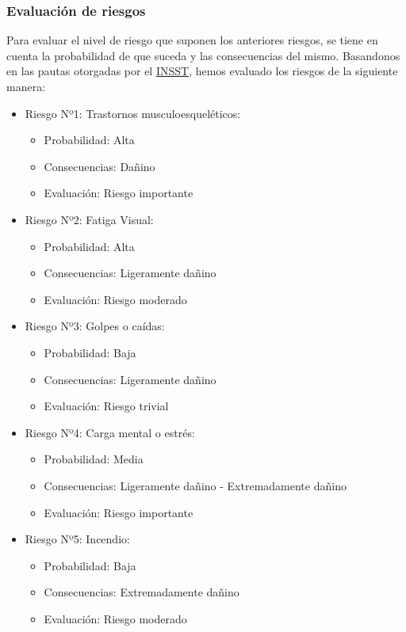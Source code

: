 \subsubsection{Evaluación de riesgos}
Para evaluar el nivel de riesgo que suponen los anteriores riesgos, se tiene en cuenta la probabilidad de que suceda
y las consecuencias del mismo. Basandonos en las pautas otorgadas por el \href{https://www.insst.es/documents/94886/96076/Evaluacion_riesgos.pdf/1371c8cb-7321-48c0-880b-611f6f380c1d?t=1526651610041}{INSST},
hemos evaluado los riesgos de la siguiente manera: \\
\begin{itemize}
    \item Riesgo Nº1: Trastornos musculoesqueléticos: \begin{itemize}
              \item Probabilidad: Alta
              \item Consecuencias: Dañino
              \item Evaluación: Riesgo importante
          \end{itemize}
    \item Riesgo Nº2: Fatiga Visual: \begin{itemize}
              \item Probabilidad: Alta
              \item Consecuencias: Ligeramente dañino
              \item Evaluación: Riesgo moderado
          \end{itemize}
    \item Riesgo Nº3: Golpes o caídas: \begin{itemize}
              \item Probabilidad: Baja
              \item Consecuencias: Ligeramente dañino
              \item Evaluación: Riesgo trivial
          \end{itemize}
    \item Riesgo Nº4: Carga mental o estrés: \begin{itemize}
              \item Probabilidad: Media
              \item Consecuencias: Ligeramente dañino - Extremadamente dañino
              \item Evaluación: Riesgo importante
          \end{itemize}
    \item Riesgo Nº5: Incendio: \begin{itemize}
              \item Probabilidad: Baja
              \item Consecuencias: Extremadamente dañino
              \item Evaluación: Riesgo moderado
          \end{itemize}
\end{itemize}

